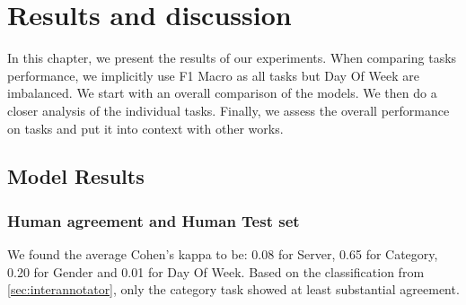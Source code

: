 \chapter{Results and discussion}
\label{chap:results}
In this chapter, we present the results of our experiments.
When comparing tasks performance, we implicitly use F1 Macro as
all tasks but Day Of Week are imbalanced. We start with an overall
comparison of the models. We then do a closer analysis of the
individual tasks. Finally, we assess the overall performance
on tasks and put it into context with other works.

\section{Model Results}
\label{sec:results}
\begin{table}[h]
\end{table}

\subsection{Human agreement and Human Test set}
\label{sec:human-baseline}
We found the average Cohen's kappa to be: 0.08 for Server, 0.65 for Category,
0.20 for Gender and 0.01 for Day Of Week. Based on the classification from \autoref{sec:interannotator},
only the category task showed at least substantial agreement.

